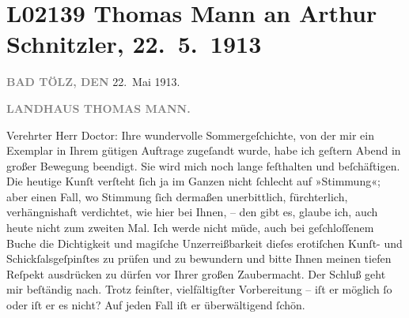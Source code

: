 

\section[Thomas Mann an Arthur Schnitzler, 22. 5. 1913]{L02139 Thomas Mann an Arthur Schnitzler, 22. 5. 1913}
\nopagebreak{}
\rehead{ }\normalsize\beginnumbering{}
\toendnotes[C]{\smallbreak\pagebreak[2]}
\toendnotes[C]{\smallbreak}
\pstart
           \raggedleft{}{\pb}\textcolor{gray}{\textbf{BAD TÖLZ, DEN}}{ }22. Mai 1913.\pend
           
\pstart
           \raggedleft{}\textcolor{gray}{\textbf{LANDHAUS THOMAS MANN.}}\pend
           
\pstart{}Verehrter Herr Doctor:\pend\vspace{0.5em}
\pstart
           Ihre wundervolle Sommergeſchichte, von der mir ein Exemplar in Ihrem gütigen Auftrage
               zugeſandt wurde, habe ich geſtern Abend in großer Bewegung beendigt. Sie wird mich
               noch lange feſthalten und beſchäftigen. Die heutige Kunſt verſteht ſich ja im Ganzen
               nicht ſchlecht auf »Stimmung«; aber einen Fall, wo Stimmung ſich dermaßen
               unerbittlich, fürchterlich, verhängnishaft verdichtet, wie hier bei Ihnen, – den gibt
               es, glaube ich, auch heute {\pb}nicht zum
               zweiten Mal. Ich werde nicht müde, auch bei geſchloſſenem Buche die Dichtigkeit und
               magiſche Unzerreißbarkeit dieſes erotiſchen Kunſt- und Schickſalsgeſpinſtes zu prüfen
               und zu bewundern und bitte Ihnen meinen tiefen Reſpekt ausdrücken zu dürfen vor Ihrer
               großen Zaubermacht. Der Schluß geht mir beſtändig nach. Trotz feinſter,
               vielfältigſter Vorbereitung – iſt er möglich ſo oder iſt er es nicht? Auf jeden Fall
               iſt er überwältigend ſchön.\pend
           
